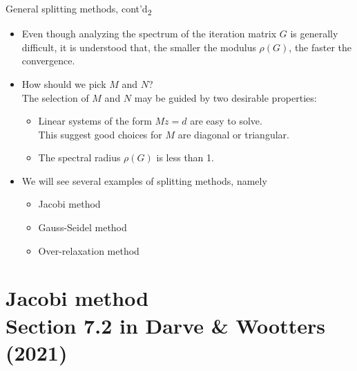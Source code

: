 \documentclass[t,usepdftitle=false]{beamer}
\begin{document}
\begin{frame}{General splitting methods, cont'd\textsubscript{2}}
\begin{itemize}
\item Even though analyzing the spectrum of the iteration matrix $G$ is generally difficult, it is understood that, the smaller the modulus $\rho(G)$, the faster the convergence.
\item How should we pick $M$ and $N$?\vspace{.1cm}\\
The selection of $M$ and $N$ may be guided by two desirable properties:
\begin{itemize}
\item Linear systems of the form $Mz=d$ are easy to solve.\vspace{.1cm}\\
This suggest good choices for $M$ are diagonal or triangular.\vspace{.1cm}\\
\item The spectral radius $\rho(G)$ is less than 1.
\end{itemize}
\item We will see several examples of splitting methods, namely
\begin{itemize}
\item Jacobi method\vspace{.1cm}
\item Gauss-Seidel method\vspace{.1cm}
\item Over-relaxation method
\end{itemize}
\end{itemize}
\end{frame}

\section{Jacobi method\\{\small Section 7.2 in Darve \& Wootters (2021)}}
\end{document}
